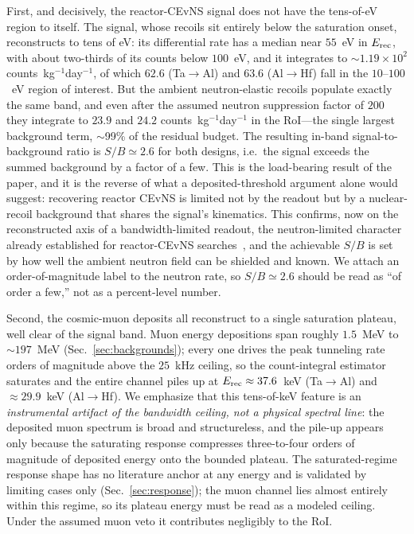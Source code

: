 First, and decisively, the reactor-CEvNS signal does not have the tens-of-eV region to itself. The signal, whose recoils sit entirely below the saturation onset, reconstructs to tens of eV: its differential rate has a median near $55$~eV in $E_{\rm rec}$, with about two-thirds of its counts below $100$~eV, and it integrates to $\sim$$1.19\times10^{2}$ counts~kg$^{-1}$day$^{-1}$, of which $62.6$ (Ta$\to$Al) and $63.6$ (Al$\to$Hf) fall in the $10$--$100$~eV region of interest. But the ambient neutron-elastic recoils populate exactly the same band, and even after the assumed neutron suppression factor of $200$ they integrate to $23.9$ and $24.2$ counts~kg$^{-1}$day$^{-1}$ in the RoI---the single largest background term, $\sim$99\% of the residual budget. The resulting in-band signal-to-background ratio is $S/B\simeq2.6$ for both designs, i.e.\ the signal exceeds the summed background by a factor of a few. This is the load-bearing result of the paper, and it is the reverse of what a deposited-threshold argument alone would suggest: recovering reactor CEvNS is limited not by the readout but by a nuclear-recoil background that shares the signal's kinematics. This confirms, now on the reconstructed axis of a bandwidth-limited readout, the neutron-limited character already established for reactor-CEvNS searches~\cite{biffl2023,conusneutron2019,ricochetneutron2023,nucleusbkg2026}, and the achievable $S/B$ is set by how well the ambient neutron field can be shielded and known. We attach an order-of-magnitude label to the neutron rate, so $S/B\simeq2.6$ should be read as ``of order a few,'' not as a percent-level number.

Second, the cosmic-muon deposits all reconstruct to a single saturation plateau, well clear of the signal band. Muon energy depositions span roughly $1.5$~MeV to $\sim$$197$~MeV (Sec.~\ref{sec:backgrounds}); every one drives the peak tunneling rate orders of magnitude above the $25$~kHz ceiling, so the count-integral estimator saturates and the entire channel piles up at $E_{\rm rec}\approx37.6$~keV (Ta$\to$Al) and $\approx29.9$~keV (Al$\to$Hf). We emphasize that this tens-of-keV feature is an \emph{instrumental artifact of the bandwidth ceiling, not a physical spectral line}: the deposited muon spectrum is broad and structureless, and the pile-up appears only because the saturating response compresses three-to-four orders of magnitude of deposited energy onto the bounded plateau. The saturated-regime response shape has no literature anchor at any energy and is validated by limiting cases only (Sec.~\ref{sec:response}); the muon channel lies almost entirely within this regime, so its plateau energy must be read as a modeled ceiling. Under the assumed muon veto it contributes negligibly to the RoI.

